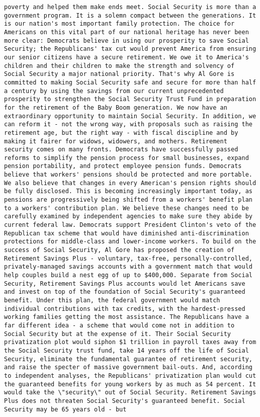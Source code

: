 \documentclass[
]{article}
\begin{document}
\begin{verbatim}
poverty and helped them make ends meet. Social Security is more than a government program. It is a solemn compact between the generations. It is our nation's most important family protection. The choice for Americans on this vital part of our national heritage has never been more clear: Democrats believe in using our prosperity to save Social Security; the Republicans' tax cut would prevent America from ensuring our senior citizens have a secure retirement. We owe it to America's children and their children to make the strength and solvency of Social Security a major national priority. That's why Al Gore is committed to making Social Security safe and secure for more than half a century by using the savings from our current unprecedented prosperity to strengthen the Social Security Trust Fund in preparation for the retirement of the Baby Boom generation. We now have an extraordinary opportunity to maintain Social Security. In addition, we can reform it - not the wrong way, with proposals such as raising the retirement age, but the right way - with fiscal discipline and by making it fairer for widows, widowers, and mothers. Retirement security comes on many fronts. Democrats have successfully passed reforms to simplify the pension process for small businesses, expand pension portability, and protect employee pension funds. Democrats believe that workers' pensions should be protected and more portable. We also believe that changes in every American's pension rights should be fully disclosed. This is becoming increasingly important today, as pensions are progressively being shifted from a workers' benefit plan to a workers' contribution plan. We believe these changes need to be carefully examined by independent agencies to make sure they abide by current federal law. Democrats support President Clinton's veto of the Republican tax scheme that would have diminished anti-discrimination protections for middle-class and lower-income workers. To build on the success of Social Security, Al Gore has proposed the creation of Retirement Savings Plus - voluntary, tax-free, personally-controlled, privately-managed savings accounts with a government match that would help couples build a nest egg of up to $400,000. Separate from Social Security, Retirement Savings Plus accounts would let Americans save and invest on top of the foundation of Social Security's guaranteed benefit. Under this plan, the federal government would match individual contributions with tax credits, with the hardest-pressed working families getting the most assistance. The Republicans have a far different idea - a scheme that would come not in addition to Social Security but at the expense of it. Their Social Security privatization plot would siphon $1 trillion in payroll taxes away from the Social Security trust fund, take 14 years off the life of Social Security, eliminate the fundamental guarantee of retirement security, and raise the specter of massive government bail-outs. And, according to independent analyses, the Republicans' privatization plan would cut the guaranteed benefits for young workers by as much as 54 percent. It would take the \"security\" out of Social Security. Retirement Savings Plus does not threaten Social Security's guaranteed benefit. Social Security may be 65 years old - but 
\end{verbatim}
\end{document}
